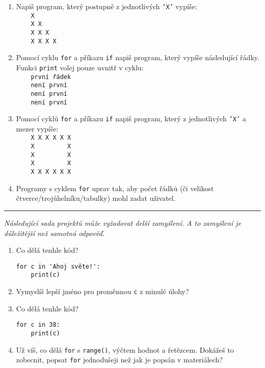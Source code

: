 \documentclass[a4paper,10pt]{article}
\newcommand\startsection[1]{
     \vspace{0.2ex}
    \hrule
    {\fontspec{Oxygen} \tiny
     \vspace{-1ex}
     \emph{#1}
     \vspace{-1.5em}
    }
}
\begin{document}
\begin{enumerate}[resume]
\item Napiš program, který postupně z jednotlivých \texttt{'X'} vypíše:
\\\verb+    X+
\\\verb+    X X+
\\\verb+    X X X+
\\\verb+    X X X X+

\item Pomocí cyklu \verb+for+ a příkazu \verb+if+ napiš program, který vypíše následující řádky. Funkci \texttt{print} volej pouze uvnitř v cyklu:
\\\verb+    první řádek+
\\\verb+    není první+
\\\verb+    není první+
\\\verb+    není první+

\item Pomocí cyklů \verb+for+ a příkazu \verb+if+ napiš program,
    který z jednotlivých \texttt{'X'} a mezer vypíše:
\\\verb+    X X X X X X+
\\\verb+    X         X+
\\\verb+    X         X+
\\\verb+    X         X+
\\\verb+    X X X X X X+

\item Programy s cyklem \verb+for+ uprav tak, aby počet řádků
    (či velikost čtverce/trojúhelníku/tabulky)
    mohl zadat uživatel.

\end{enumerate}

\startsection{Následující sada projektů může vyžadovat delší zamyšlení. A to zamyšlení je důležitější než samotná odpověď.}

\begin{enumerate}[resume]
\item Co dělá tenhle kód?
\begin{verbatim}
for c in 'Ahoj světe!':
    print(c)
\end{verbatim}

\item Vymyslíš lepší jméno pro proměnnou \verb+c+ z minulé úlohy?

\item Co dělá tenhle kód?
\begin{verbatim}
for c in 38:
    print(c)
\end{verbatim}

\item Už víš, co dělá \texttt{for} s \texttt{range()}, výčtem hodnot a řetězcem.
    Dokážeš to zobecnit, popsat \texttt{for} jednodušeji než jak je popsán v materiálech?

\end{enumerate}
\end{document}
